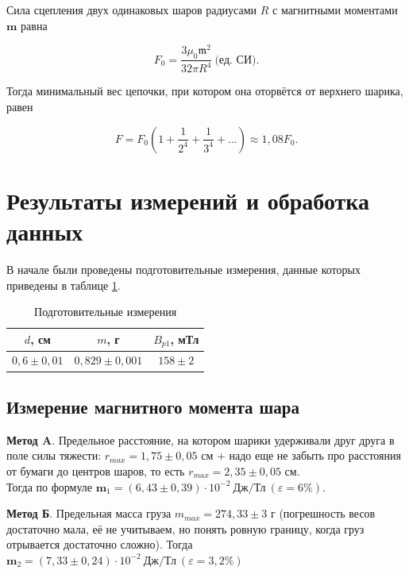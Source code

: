 \documentclass[a4paper, 12pt]{article}
\begin{document}
	Сила сцепления двух одинаковых шаров радиусами $R$ с магнитными моментами $\mathbf{m}$ равна 
	
	\begin{equation*}
		F_0 = \frac{3 \mu_0 \mathfrak{m}^2}{32 \pi R^4}\  \text{(ед. СИ).}    
	\end{equation*}
	
	Тогда минимальный вес цепочки, при котором она оторвётся от верхнего шарика, равен
	
	\begin{equation*}
		F = F_0\left(1 + \frac{1}{2^4} + \frac{1}{3^4} + ... \right) \approx 1,08F_0.
	\end{equation*}
	
	\vspace{2cm}
	
	\section*{Результаты измерений и обработка данных}
	В начале были проведены подготовительные измерения, данные которых приведены в таблице \ref{prep}.
	\begin{table}[H]
		\centering
		\begin{tabular}{|c|c|c|}
			\hline $d$, см & $m$, г & $B_{p1}$, мТл \\ \hline
			$0,6 \pm 0,01$   & $0,829 \pm 0,001$ &  $158 \pm 2$  \\ \hline
		\end{tabular}
		\caption{Подготовительные измерения}
		\label{prep}
	\end{table}
	\subsection*{Измерение магнитного момента шара}
	
	\textbf{Метод $\mathbf{A}$}. Предельное расстояние, на котором шарики удерживали друг друга в поле силы тяжести: $r_{max} = 1,75 \pm 0,05$ см + надо еще не забыть про расстояния от бумаги до центров шаров, то есть $r_{max}  = 2,35 \pm 0,05$ см.\\ Тогда по формуле $\mathbf{m}_1 = (6,43 \pm 0,39) \cdot 10^{-2} \ \text{Дж}/\text{Тл} \ (\varepsilon = 6 \%)$.
	
	\textbf{Метод Б}. Предельная масса груза $m_{max}=  274,33 \pm 3 $ г (погрешность весов достаточно мала, её не учитываем, но понять ровную границу, когда груз отрывается достаточно сложно). Тогда $\mathbf{m}_2 = (7,33 \pm 0,24) \cdot 10^{-2}  \ \text{Дж}/\text{Тл} \ (\varepsilon = 3,2 \%)$
	
\end{document}
